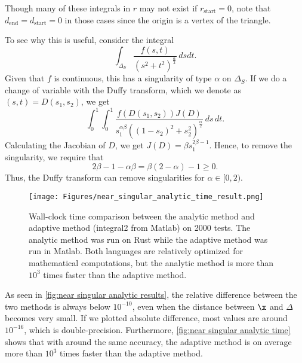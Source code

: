 \documentclass{article}
\numberwithin{equation}{section}
\begin{document}
Though many of these integrals in $r$ may not exist if $r_\mathrm{start} = 0$, note that $d_\mathrm{end}=d_\mathrm{start}=0$ in those cases since the origin is a vertex of the triangle.



To see why this is useful, consider the integral
\begin{equation}
    \int_{\Delta_S} \frac{f(s, t)}{(s^2+t^2)^{\frac{\alpha}{2}}}\, dsdt.
\end{equation}
Given that $f$ is continuous, this has a singularity of type $\alpha$ on $\Delta_S$. 
If we do a change of variable with the Duffy transform, which we denote as $(s, t) = D(s_1, s_2)$, we get 
\begin{equation}
        \int_0^1 \int_0^1 \frac{f(D(s_1, s_2))J(D)}{s_1^{\alpha\beta}((1-s_2)^2+s_2^2)^{\frac{\alpha}{2}}}\, ds\,dt.
\end{equation}
Calculating the Jacobian of $D$, we get $J(D) = \beta s_1^{2\beta - 1}$. Hence, to remove the singularity, we require that 
\begin{equation}\label{Duffy condition}
    2\beta - 1 - \alpha\beta = \beta (2-\alpha) - 1 \geq 0.
\end{equation}
Thus, the Duffy transform can remove singularities for $\alpha \in [0, 2)$. 


\begin{figure}
    \centering
    \texttt{[image: Figures/near\_singular\_analytic\_time\_result.png]}
    \caption{Wall-clock time comparison between the analytic method and adaptive method (integral2 from Matlab) on 2000 tests. The analytic method was run on Rust while the adaptive method was run in Matlab. Both languages are relatively optimized for mathematical computations, but the analytic method is more than $10^3$ times faster than the adaptive method.}
    \label{fig:near singular analytic time}
\end{figure}
As seen in \autoref{fig:near singular analytic results}, the relative difference between the two methods is always below $10^{-10}$, even when the distance between $\x$ and $\Delta$ becomes very small. If we plotted absolute difference, most values are around $10^{-16}$, which is double-precision. Furthermore, \autoref{fig:near singular analytic time} shows that with around the same accuracy, the adaptive method is on average more than $10^3$ times faster than the adaptive method. 
\end{document}
